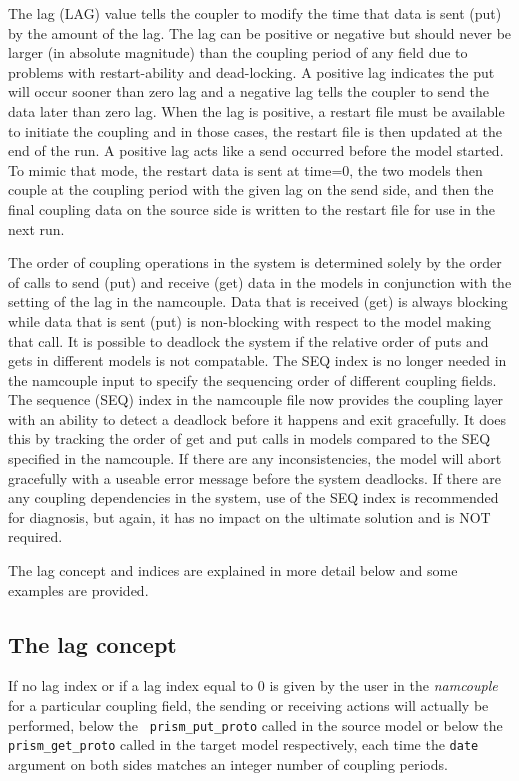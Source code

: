 The lag (LAG) value tells the coupler to modify the time that data
is sent (put) by the amount of the lag.  The lag can be positive or
negative but should never be larger (in absolute magnitude) than the
coupling period of any field due to problems with restart-ability and
dead-locking.  A positive lag indicates the
put will occur sooner than zero lag and a negative lag tells the coupler
to send the data later than zero lag.  When the lag is positive, 
a restart file must be available to initiate the coupling and in those cases, 
the restart file is then updated at the end of the run.  A positive
lag acts like a send occurred before the model started.  To mimic that
mode, the restart data is sent at time=0, the two models then couple at the coupling
period with the given lag on the send side, and then the final coupling
data on the source side is written to the restart file for use in the
next run.  

The order of coupling operations in the system is determined solely
by the order of calls to send (put) and receive (get) data in the models
in conjunction with the setting of the lag in the namcouple.  Data that is
received (get) is always blocking while data that is sent (put) is non-blocking
with respect to the model making that call.  It is possible
to deadlock the system if the relative order of puts and gets in different
models is not compatable.  The SEQ index is no longer needed in the namcouple
input to specify the sequencing order of different coupling fields.
The sequence (SEQ) index in the namcouple file now provides the coupling 
layer with an ability to detect a deadlock before it happens and exit 
gracefully.  It does this by tracking the order of get and put calls in
models compared to the SEQ specified in the namcouple.  If there are any
inconsistencies, the model will abort gracefully with a useable error
message before the system deadlocks.  If there are any coupling dependencies
in the system, use of the SEQ index is recommended for diagnosis, but again,
it has no impact on the ultimate solution and is NOT required.

The lag concept and indices are explained in more detail below and some
examples are provided.

\subsection{The lag concept}
\label{subsub_lag}

If no lag index or if a lag index equal to 0 is given by the user in
the {\it namcouple} for a particular coupling field, the sending or
receiving actions will actually be performed, below the {\tt
  prism\_put\_proto} called in the source model or below the {\tt
  prism\_get\_proto} called in the target model respectively, each time the
{\tt date} argument on both sides matches an integer number of
coupling periods.
 
